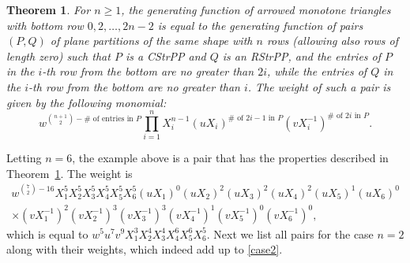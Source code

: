 \documentclass[12pt]{amsart}
\newtheorem{theorem}{Theorem}[section]
\theoremstyle{definition}
\numberwithin{equation}{section}
\newcommand{\CSPP}{CStrPP\xspace}
\newcommand{\RSPP}{RStrPP\xspace}
\begin{document}
\begin{theorem} 
\label{interpret4} 
For $n \ge 1$, the generating function of arrowed monotone triangles with bottom row 
$0,2,\ldots,2n-2$ is equal to the generating function of pairs $(P,Q)$ of plane partitions of the same shape with $n$ rows (allowing also rows of length zero) 
such that $P$ is a 
\CSPP and $Q$ is an \RSPP, and
the entries of $P$ in the $i$-th row from the bottom are no greater than $2i$, while the entries of $Q$ in the $i$-th row from the bottom are no greater than $i$. The weight of such a pair is given by the following monomial:
\begin{equation*}
w^{\binom{n+1}{2}-\# \text{ of entries in $P$}} \prod_{i=1}^{n} X_i^{n-1} (u X_i)^{\# \text{ of $2i-1$ in $P$}} (v X_i^{-1})^{\# \text{ of $2i$ in $P$}}.
\end{equation*}
\end{theorem} 


Letting $n=6$, the example above is a pair that has the properties described in Theorem~\ref{interpret4}. The weight is 
\begin{multline*}
w^{\binom{7}{2} - 16} X_1^5 X_2^5 X_3^5 X_4^5 X_5^5 X_6^5 (u X_1)^0 (u X_2)^2 (u X_3)^2 (u X_4)^2 (u X_5)^1 (u X_6)^0 \\
\times (v X_1^{-1})^2 (v X_2^{-1})^3 (v X_3^{-1})^3 (v X_4^{-1})^1 (v X_5^{-1})^0 
(v X_6^{-1})^0,
\end{multline*}
which is equal to $w^{5} u^{7} v^{9} X_1^3 X_2^4 X_3^4 X_4^6 X_5^6 X_6^5$. Next we list all pairs for the case $n=2$ along with their weights, which indeed add up to \eqref{case2}.

\end{document}

